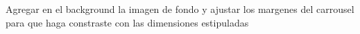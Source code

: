 Agregar en el background la imagen de fondo y ajustar los margenes del carrousel
para que haga constraste con las dimensiones estipuladas